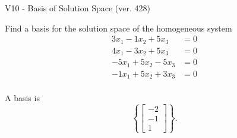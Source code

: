 \begin{exercise}
  \begin{exerciseTitle}V10 - Basis of Solution Space (ver. 428)\end{exerciseTitle}
  \begin{exerciseStatement}
    Find a basis for the solution space of the homogeneous system 
\begin{align*}
 3 x_ 1 -1 x_ 2 + 5 x_ 3 &= 0  \\ 
  4 x_ 1 -3 x_ 2 + 5 x_ 3 &= 0  \\ 
  -5 x_ 1 + 5 x_ 2 -5 x_ 3 &= 0  \\ 
  -1 x_ 1 + 5 x_ 2 + 3 x_ 3 &= 0  \\ 
 \end{align*}


 
  \end{exerciseStatement}

  \begin{exerciseAnswer}
   A basis is   
\[\left\{\left[\begin{array}{c}
-2 \\
-1 \\
1
\end{array}\right]\right\}.\]

  


  \end{exerciseAnswer}
\end{exercise}